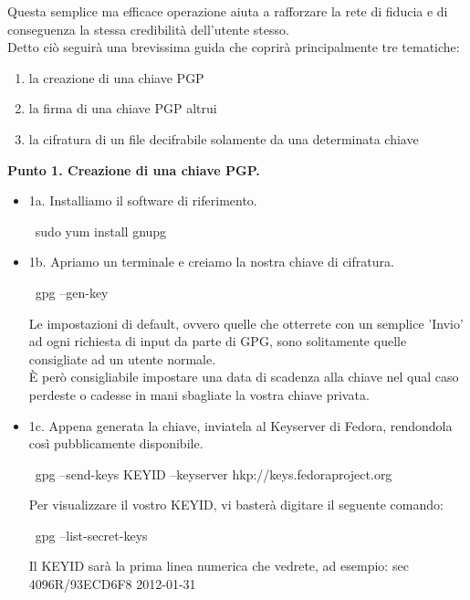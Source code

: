Questa semplice ma efficace operazione aiuta a rafforzare la rete di fiducia e di conseguenza la stessa credibilità dell'utente stesso.\\

Detto ciò seguirà una brevissima guida che coprirà principalmente tre tematiche:\\
   
\begin{enumerate}
\item la creazione di una chiave PGP 
\item la firma di una chiave PGP altrui
\item la cifratura di un file decifrabile solamente da una determinata chiave
\end{enumerate}

{\bfseries\centering Punto 1. Creazione di una chiave PGP.}\\

\begin{itemize}
\item 1a. Installiamo il software di riferimento.\\
\begin{shaded}
{\color[cmyk]{0, 0, 0, 0}\textdollar\ sudo yum install gnupg}\\
\end{shaded}
\item 1b. Apriamo un terminale e creiamo la nostra chiave di cifratura.\\
\begin{shaded}
{\color[cmyk]{0, 0, 0, 0}\textdollar\ gpg --gen-key}\\
\end{shaded}
Le impostazioni di default, ovvero quelle che otterrete con un semplice 'Invio' ad ogni richiesta di input da parte di GPG, sono solitamente quelle consigliate ad un utente normale.\\
È però consigliabile impostare una data di scadenza alla chiave nel qual caso perdeste o cadesse in mani sbagliate la vostra chiave privata.\\
\item 1c. Appena generata la chiave, inviatela al Keyserver di Fedora, rendondola così pubblicamente disponibile.\\
\begin{shaded}
{\color[cmyk]{0, 0, 0, 0}\textdollar\ gpg --send-keys KEYID --keyserver hkp://keys.fedoraproject.org}\\
\end{shaded}
Per visualizzare il vostro KEYID, vi basterà digitare il seguente comando:
\begin{shaded}
{\color[cmyk]{0, 0, 0, 0}\textdollar\ gpg --list-secret-keys}\\
\end{shaded}
Il KEYID sarà la prima linea numerica che vedrete, ad esempio: sec   4096R/93ECD6F8 2012-01-31\\
\end{itemize}

